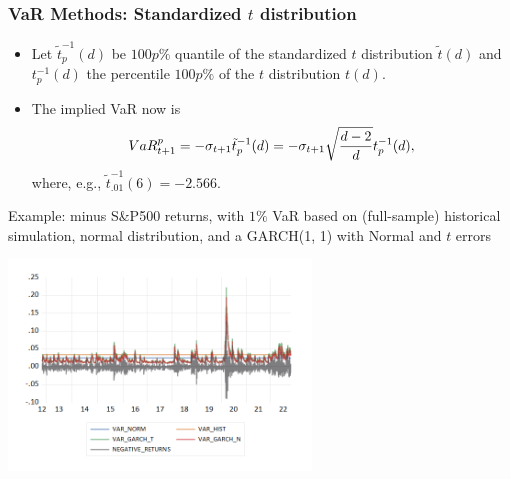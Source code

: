 \begin{frame}%

\frametitle{VaR Methods: Standardized $t$ distribution}

\begin{itemize}
\item Let $\tilde{t}_{p}^{-1}(d)$ be $100p\%$ quantile of the
standardized $t$ distribution $\tilde{t}(d)$ and $t_{p}^{-1}(d)$ the
percentile $100p\%$ of the $t$ distribution $t(d).$

\item The implied VaR now is
\begin{equation*}
VaR_{t+1}^{p}=-\sigma _{t+1}\tilde{t}_{p}^{-1}(d)=-\sigma _{t+1}\sqrt{\frac{%
d-2}{d}}t_{p}^{-1}(d),
\end{equation*}%
where, e.g., $\tilde{t}_{.01}^{-1}(6)=-2.566$.
\end{itemize}


\end{frame}%
\begin{frame}%

\begin{block}{Example: minus S\&P500 returns, with $1\%$ VaR
based on (full-sample) historical simulation, normal distribution, and a GARCH(1, 1) with Normal and $t$ errors}
\centerline{\includegraphics[height=2.2in]{VAR}}
\end{block}
\end{frame}%
%
%
